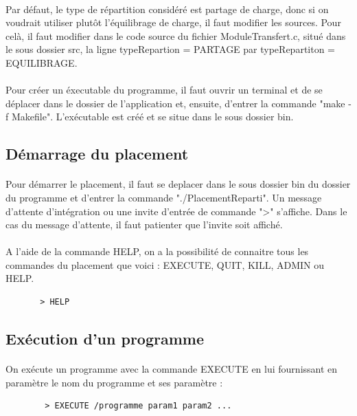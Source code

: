     \paragraph{}
    Par défaut, le type de répartition considéré est partage de charge,
    donc si on voudrait utiliser plutôt l'équilibrage de charge, il faut
    modifier les sources. Pour celà, il faut modifier dans le code
    source du fichier ModuleTransfert.c, situé dans le sous dossier src,
    la ligne typeRepartion = PARTAGE par typeRepartiton = EQUILIBRAGE.

    \paragraph{}
    Pour créer un éxecutable du programme, il faut ouvrir un terminal et 
    de se déplacer dans le dossier de l'application et, ensuite, 
    d'entrer la commande "make -f Makefile". L'exécutable est créé et se 
    situe dans le sous dossier bin.
    
    \subsection{Démarrage du placement}
    \paragraph{}
     Pour démarrer le placement, il faut se deplacer dans le sous 
     dossier bin du dossier du programme et d'entrer la commande
     "./PlacementReparti". Un message d'attente d'intégration ou une 
     invite d'entrée de commande ">" s'affiche. Dans le cas du message 
     d'attente, il faut patienter que l'invite soit affiché.
     
     \paragraph{}
     A l'aide de la commande HELP, on a la possibilité de connaitre tous 
     les commandes du placement  que voici : EXECUTE, QUIT, KILL, 
     ADMIN ou HELP. 
     \begin{verbatim}
       > HELP
     \end{verbatim}
     
     
    \subsection{Exécution d'un programme}
      \paragraph{}
      On exécute un programme avec la commande EXECUTE en lui fournissant 
      en paramètre le nom du programme et ses paramètre :
      \begin{verbatim}
        > EXECUTE /programme param1 param2 ...
      \end{verbatim}
      
